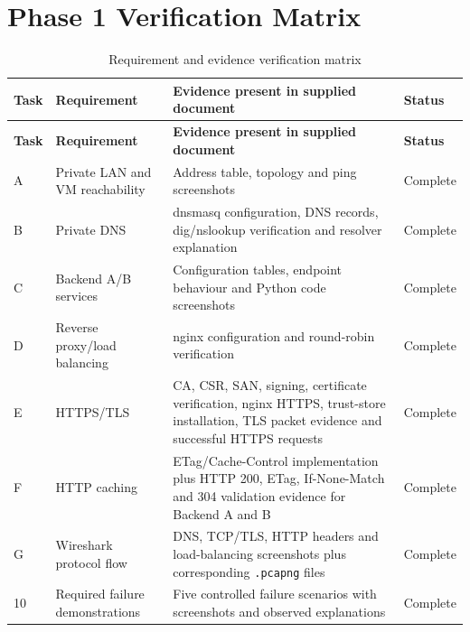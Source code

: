 \documentclass[12pt,a4paper]{article}
\begin{document}
\section{Phase 1 Verification Matrix}
\small\begin{longtable}{L{0.07\textwidth}L{0.27\textwidth}L{0.42\textwidth}L{0.10\textwidth}}
\caption{Requirement and evidence verification matrix}\label{tab:verification-matrix}\\
\toprule
\textbf{Task} & \textbf{Requirement} & \textbf{Evidence present in supplied document} & \textbf{Status}\\
\midrule
\endfirsthead
\toprule
\textbf{Task} & \textbf{Requirement} & \textbf{Evidence present in supplied document} & \textbf{Status}\\
\midrule
\endhead
A & Private LAN and VM reachability & Address table, topology and ping screenshots & Complete\\
B & Private DNS & dnsmasq configuration, DNS records, dig/nslookup verification and resolver explanation & Complete\\
C & Backend A/B services & Configuration tables, endpoint behaviour and Python code screenshots & Complete\\
D & Reverse proxy/load balancing & nginx configuration and round-robin verification & Complete\\
E & HTTPS/TLS & CA, CSR, SAN, signing, certificate verification, nginx HTTPS, trust-store installation, TLS packet evidence and successful HTTPS requests & Complete\\
F & HTTP caching & ETag/Cache-Control implementation plus HTTP 200, ETag, If-None-Match and 304 validation evidence for Backend A and B & Complete\\
G & Wireshark protocol flow & DNS, TCP/TLS, HTTP headers and load-balancing screenshots plus corresponding \texttt{.pcapng} files & Complete\\
10 & Required failure demonstrations & Five controlled failure scenarios with screenshots and observed explanations & Complete\\
\bottomrule
\end{longtable}
\end{document}
